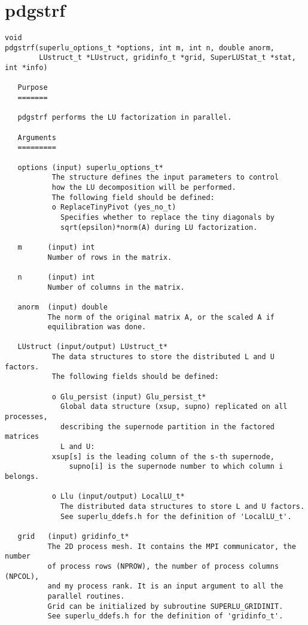 \section{pdgstrf}
\begin{verbatim}
void
pdgstrf(superlu_options_t *options, int m, int n, double anorm,
        LUstruct_t *LUstruct, gridinfo_t *grid, SuperLUStat_t *stat, int *info)

   Purpose
   =======
    
   pdgstrf performs the LU factorization in parallel.
  
   Arguments
   =========
   
   options (input) superlu_options_t*
           The structure defines the input parameters to control
           how the LU decomposition will be performed.
           The following field should be defined:
           o ReplaceTinyPivot (yes_no_t)
             Specifies whether to replace the tiny diagonals by
             sqrt(epsilon)*norm(A) during LU factorization.
  
   m      (input) int
          Number of rows in the matrix.
  
   n      (input) int
          Number of columns in the matrix.
  
   anorm  (input) double
          The norm of the original matrix A, or the scaled A if
          equilibration was done.
  
   LUstruct (input/output) LUstruct_t*
           The data structures to store the distributed L and U factors.
           The following fields should be defined:
  
           o Glu_persist (input) Glu_persist_t*
             Global data structure (xsup, supno) replicated on all processes,
             describing the supernode partition in the factored matrices
             L and U:
  	       xsup[s] is the leading column of the s-th supernode,
               supno[i] is the supernode number to which column i belongs.
  
           o Llu (input/output) LocalLU_t*
             The distributed data structures to store L and U factors.
             See superlu_ddefs.h for the definition of 'LocalLU_t'.
  
   grid   (input) gridinfo_t*
          The 2D process mesh. It contains the MPI communicator, the number
          of process rows (NPROW), the number of process columns (NPCOL),
          and my process rank. It is an input argument to all the
          parallel routines.
          Grid can be initialized by subroutine SUPERLU_GRIDINIT.
          See superlu_ddefs.h for the definition of 'gridinfo_t'.
  

\end{verbatim}
